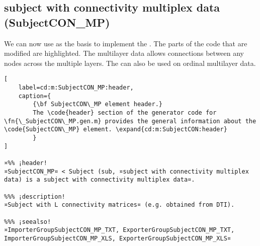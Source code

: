 \documentclass{tufte-handout}
\begin{document}
\clearpage
\subsection{subject with connectivity multiplex data (SubjectCON\_MP)}

We can now use  as the basis to implement the . The parts of the code that are modified are highlighted.
The multilayer data allows connections between any nodes across the multiple layers. The  can also be used on ordinal multilayer data.
\begin{lstlisting}[
	label=cd:m:SubjectCON_MP:header,
	caption={
		{\bf SubjectCON\_MP element header.}
		The \code{header} section of the generator code for \fn{\_SubjectCON\_MP.gen.m} provides the general information about the \code{SubjectCON\_MP} element. \expand{cd:m:SubjectCON:header}
		}
]

¤%% ¡header!
¤SubjectCON_MP¤ < Subject (sub, ¤subject with connectivity multiplex data) is a subject with connectivity multiplex data¤.

%%% ¡description!
¤Subject with L connectivity matrices¤ (e.g. obtained from DTI).

%%% ¡seealso!
¤ImporterGroupSubjectCON_MP_TXT, ExporterGroupSubjectCON_MP_TXT, ImporterGroupSubjectCON_MP_XLS, ExporterGroupSubjectCON_MP_XLS¤
\end{lstlisting}
\end{document}
